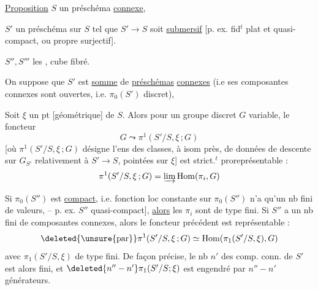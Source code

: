 \uline{Proposition} \quad $S$ un préschéma \uline{connexe},

$S'$ un préschéma sur $S$ tel que $S'\longrightarrow S$ soit \uline{submersif} [p. ex. fid$^{t}$ plat et quasi-compact, ou propre surjectif].

$S'',S'''$ les , cube fibré.

On suppose que $S'$ est \uline{somme} de \uline{préschémas} \uline{connexes} (i.e ses composantes connexes sont ouvertes, i.e. $\pi_0(S')$ discret), 

Soit $\xi$ un pt [géométrique] de $S$. Alors pour un groupe discret $G$ variable, le foncteur
\[
G\leadsto\pi^1(S'/S,\xi\,;G)
\]
 [où $\pi^1(S'/S,\xi\,;G)$ désigne l'ens des classes, à isom près, de données de descente sur  $G_{S'}$ relativement à $S'\to S$, pointées sur $\xi$] est strict.$^{t}$ proreprésentable :
\[
\pi^1(S'/S,\xi\,;G)=\varinjlim\operatorname{Hom}(\pi_i,G)
\]

Si $\pi_0(S'')$ est \uline{compact}, i.e.  fonction loc constante sur $\pi_0(S'')$ n'a qu'un nb fini de valeurs, -- p. ex. $S''$ quasi-compact], \deleted{\unsure{ou} $S''$ n'a qu'un nb fini de composantes connexes]} \uline{alors} les $\pi_i$ sont de type fini. Si $S''$ a un nb fini  de composantes connexes, alors le foncteur précédent est représentable : 
\[
\deleted{\text{\unsure{par}}}\pi^1(S'/S,\xi\,;G)\simeq\operatorname{Hom}(\pi_1(S'/S,\xi),G)
\]
avec $\pi_1(S'/S,\xi)$   de type fini. De façon précise,  le nb $n'$ des comp. conn. de $S'$ est alors fini, et $\deleted{n''-n'}\pi_1(S'/S;\xi)$ est engendré par $n''-n'$ générateurs.

